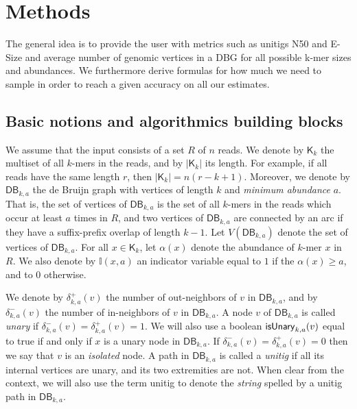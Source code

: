 \documentclass[a4paper,11pt]{article}
\newcommand{\kristoffer}[1]{{\color{red}{#1}}}
\newcommand{\alex}[1]{{\color{blue}{#1}}}
\newcommand{\DB}{\mathsf{DB}_{k,a}}
\newcommand{\dplus}{\delta^+_{k,a}}
\newcommand{\dminus}{\delta^-_{k,a}}
\newcommand{\K}{\mathsf{K}}
\newcommand{\abu}{\alpha}
\newcommand{\isunary}{{\sf isUnary}_{k,a}}
\renewcommand{\geq}{\geqslant}
\begin{document}
\section{Methods} %
\label{sec:methods}

The general idea is to provide the user with metrics such as unitigs N50 and E-Size and average number of genomic vertices in a DBG  for all possible k-mer sizes and abundances. \kristoffer{ We implement a FM-index data structure described in cite XX. This allows us to query a k-mer, its in and out neighbors in O() time. }  We furthermore derive formulas for how much we need to sample in order to reach a given accuracy on all our estimates. 

\alex{Say that one of the main ideas is to do weighted sampling.}

\alex{Say that we compute for all abundances at the same time.}

\alex{Say that we can query every sampled $k$-mer in parallel.}

\subsection{Basic notions and algorithmics building blocks}

We assume that the input consists of a set $R$ of $n$ reads. We denote by $\K_k$ the multiset of all $k$-mers in the reads, and by $|\K_k|$ its length. For example, if all reads have the same length $r$, then $|\K_k| = n(r-k+1)$. Moreover, we denote by $\DB$ the de Bruijn graph with vertices of length $k$ and \emph{minimum abundance} $a$. That is, the set of vertices of $\DB$ is the set of all $k$-mers in the reads which occur at least $a$ times in $R$, and two vertices of $\DB$ are connected by an arc if they have a suffix-prefix overlap of length $k-1$. Let $V(\DB)$ denote the set of vertices of $\DB$. For all $x \in \K_k$, let $\abu(x)$ denote the abundance of $k$-mer $x$ in $R$. We also denote by $\mathbb{I}(x,a)$ an indicator variable equal to $1$ if the $\abu(x) \geq a$, and to $0$ otherwise.

We denote by $\dplus(v)$ the number of out-neighbors of $v$ in $\DB$, and by $\dminus(v)$ the number of in-neighbors of $v$ in $\DB$. A  node $v$ of $\DB$ is called \emph{unary} if $\dminus(v) = \dplus(v) = 1$. We will also use a boolean $\isunary(v)$ equal to true if and only if $x$ is a unary node in $\DB$. If $\dminus(v) = \dplus(v) = 0$ then we say that $v$ is an \emph{isolated} node. A path in $\DB$ is called a \emph{unitig} if all its internal vertices are unary, and its two extremities are not. When clear from the context, we will also use the term unitig to denote the \emph{string} spelled by a unitig path in $\DB$. 
\end{document}
